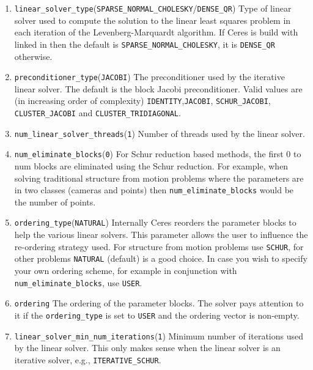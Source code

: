 \begin{enumerate}
\item{\texttt{linear\_solver\_type}}(\texttt{SPARSE\_NORMAL\_CHOLESKY}/\texttt{DENSE\_QR}) Type of linear solver used to compute the solution to the linear least squares problem in each iteration of the Levenberg-Marquardt algorithm. If Ceres is build with \suitesparse linked in  then the default is \texttt{SPARSE\_NORMAL\_CHOLESKY}, it is \texttt{DENSE\_QR} otherwise.

\item{\texttt{preconditioner\_type}}(\texttt{JACOBI}) The preconditioner used by the iterative linear solver. The default is the block Jacobi preconditioner. Valid values are (in increasing order of complexity) \texttt{IDENTITY},\texttt{JACOBI}, \texttt{SCHUR\_JACOBI}, \texttt{CLUSTER\_JACOBI} and \texttt{CLUSTER\_TRIDIAGONAL}.

\item{\texttt{num\_linear\_solver\_threads}}(\texttt{1}) Number of threads used by the linear solver. 

\item{\texttt{num\_eliminate\_blocks}}(\texttt{0}) 
For Schur reduction based methods, the first 0 to num blocks are
    eliminated using the Schur reduction. For example, when solving
     traditional structure from motion problems where the parameters are in
     two classes (cameras and points) then \texttt{num\_eliminate\_blocks} would be the
     number of points.

\item{\texttt{ordering\_type}}(\texttt{NATURAL})
 Internally Ceres reorders the parameter blocks to help the
 various linear solvers. This parameter allows the user to
     influence the re-ordering strategy used. For structure from
     motion problems use \texttt{SCHUR}, for other problems \texttt{NATURAL} (default)
     is a good choice. In case you wish to specify your own ordering
     scheme, for example in conjunction with \texttt{num\_eliminate\_blocks},
     use \texttt{USER}.

\item{\texttt{ordering}} The ordering of the parameter blocks. The solver pays attention
    to it if the \texttt{ordering\_type} is set to \texttt{USER} and the ordering vector is
    non-empty.


\item{\texttt{linear\_solver\_min\_num\_iterations}}(\texttt{1}) Minimum number of iterations used by the linear solver. This only makes sense when the linear solver is an iterative solver, e.g., \texttt{ITERATIVE\_SCHUR}.


\end{enumerate}
